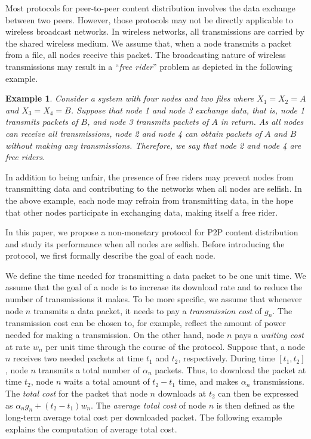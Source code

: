 \documentclass[11pt, conference]{IEEEtran}
\newtheorem{example}{Example}
\begin{document}
Most protocols for peer-to-peer content distribution involves the data exchange between two peers. However, those protocols may not be directly applicable to wireless broadcast networks. In wireless networks, all transmissions are carried by the shared wireless medium. We assume that, when a node transmits a packet from a file, all nodes receive this packet. The broadcasting nature of wireless transmissions may result in a ``\emph{free rider}'' problem as depicted in the following example.

\begin{example}
Consider a system with four nodes and two files where $X_1=X_2=A$ and $X_3=X_4=B$. Suppose that node 1 and node 3 exchange data, that is, node 1 transmits packets of $B$, and node 3 transmits packets of $A$ in return. As all nodes can receive all transmissions, node 2 and node 4 can obtain packets of $A$ and $B$ without making any transmissions. Therefore, we say that node 2 and node 4 are \emph{free riders}.
\end{example}

In addition to being unfair, the presence of free riders may prevent nodes from transmitting data and contributing to the networks when all nodes are selfish. In the above example, each node may refrain from transmitting data, in the hope that other nodes participate in exchanging data, making itself a free rider.

In this paper, we propose a non-monetary protocol for P2P content distribution and study its performance when all nodes are selfish. Before introducing the protocol, we first formally describe the goal of each node.

We define the time needed for transmitting a data packet to be one unit time. We assume that the goal of a node is to increase its download rate and to reduce the number of transmissions it makes. To be more specific, we assume that whenever node $n$ transmits a data packet, it needs to pay a \emph{transmission cost} of $g_n$. The transmission cost can be chosen to, for example, reflect the amount of power needed for making a transmission. On the other hand, node $n$ pays a \emph{waiting cost} at rate $w_n$ per unit time through the course of the protocol. Suppose that, a node $n$ receives two needed packets at time $t_1$ and $t_2$, respectively. During time $[t_1,t_2]$, node $n$ transmits a total number of $\alpha_n$ packets. Thus, to download the packet at time $t_2$, node $n$ waits a total amount of $t_2-t_1$ time, and makes $\alpha_n$ transmissions. The \emph{total cost} for the packet that node $n$ downloads at $t_2$ can then be expressed as $\alpha_ng_n+(t_2-t_1)w_n$. The \emph{average total cost} of node $n$ is then defined as the long-term average total cost per downloaded packet. The following example explains the computation of average total cost.
\end{document}
